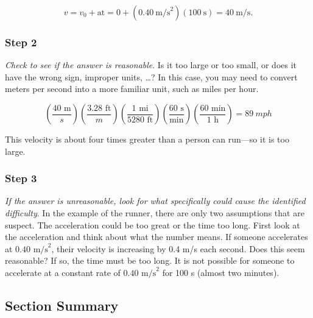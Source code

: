 \documentclass[
]{book}
\begin{document}
\leavevmode\hypertarget{import-auto-id4167672}{}%
\[{{{{v = {v_{0} + \text{at}}} = {0 + \left( {0\text{.}\text{40}\ \text{m/s}^{2}} \right)}}{\left( {\text{100}\ \text{s}} \right) = \text{40}}\ \text{m/s}}.}{}\]

\hypertarget{fs-id2525779}{}
\hypertarget{step-2-1}{%
\subsubsection{Step 2}\label{step-2-1}}

\emph{Check to see if the answer is reasonable}. Is it too large or too
small, or does it have the wrong sign, improper units, \ldots? In this
case, you may need to convert meters per second into a more familiar
unit, such as miles per hour.

\leavevmode\hypertarget{import-auto-id1437508}{}%
\[\left( \frac{\text{40\ m}}{s} \right)\left( \frac{\text{3.28\ ft}}{m} \right)\left( \frac{\text{1\ mi}}{\text{5280\ ft}} \right)\left( \frac{\text{60\ s}}{\text{min}} \right){\left( \frac{\text{60\ min}}{\text{1\ h}} \right) = 89\ mph}\]

This velocity is about four times greater than a person can run---so it
is too large.

\hypertarget{fs-id4130945}{}
\hypertarget{step-3-1}{%
\subsubsection{Step 3}\label{step-3-1}}

\emph{If the answer is unreasonable, look for what specifically could cause
the identified difficulty}. In the example of the runner, there are only
two assumptions that are suspect. The acceleration could be too great or
the time too long. First look at the acceleration and think about what
the number means. If someone accelerates at
\({0\text{.}\text{40\ m/s}^{2}}{}\), their velocity is increasing by 0.4
m/s each second. Does this seem reasonable? If so, the time must be too
long. It is not possible for someone to accelerate at a constant rate of
\({0\text{.}\text{40\ m/s}^{2}}{}\) for 100 s (almost two minutes).

\hypertarget{fs-id1602384-summary}{}
\hypertarget{section-summary-5}{%
\subsection{Section Summary}\label{section-summary-5}}
\end{document}
